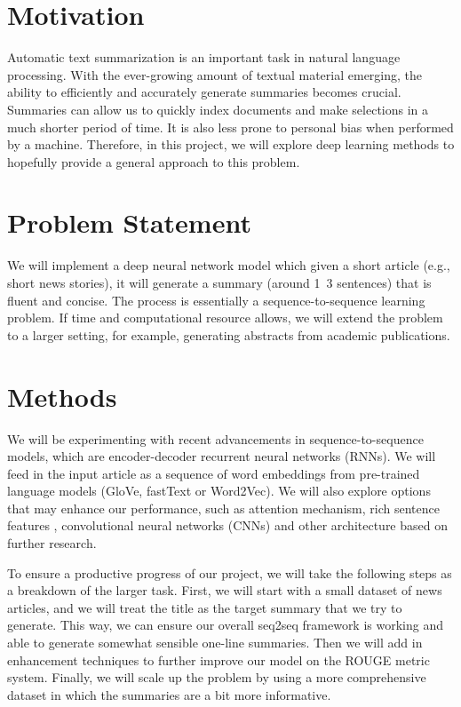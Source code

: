 \section{Motivation}
Automatic text summarization is an important task in natural language processing. With the ever-growing amount of textual material emerging, the ability to efficiently and accurately generate summaries becomes crucial. Summaries can allow us to quickly index documents and make selections in a much shorter period of time. It is also less prone to personal bias when performed by a machine. Therefore, in this project, we will explore deep learning methods to hopefully provide a general approach to this problem.

\section{Problem Statement}
We will implement a deep neural network model which given a short article (e.g., short news stories), it will generate a summary (around 1~3 sentences) that is fluent and concise. The process is essentially a sequence-to-sequence learning problem. If time and computational resource allows, we will extend the problem to a larger setting, for example, generating abstracts from academic publications. 



\section{Methods}
We will be experimenting with recent advancements in sequence-to-sequence models, which are encoder-decoder recurrent neural networks (RNNs). We will feed in the input article as a sequence of word embeddings from pre-trained language models (GloVe, fastText or Word2Vec). We will also explore options that may enhance our performance, such as attention mechanism, rich sentence features , convolutional neural networks (CNNs) and other architecture based on further research.  

To ensure a productive progress of our project, we will take the following steps as a breakdown of the larger task. First, we will start with a small dataset of news articles, and we will treat the title as the target summary that we try to generate. This way, we can ensure our overall seq2seq framework is working and able to generate somewhat sensible one-line summaries. Then we will add in enhancement techniques to further improve our model on the ROUGE metric system. Finally, we will scale up the problem by using a more comprehensive dataset in which the summaries are a bit more informative. 

